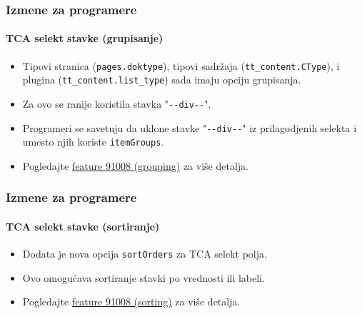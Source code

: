 
\begin{frame}[fragile]
	\frametitle{Izmene za programere}
	\framesubtitle{TCA selekt stavke (grupisanje)}

	\begin{itemize}
		\item Tipovi stranica (\texttt{pages.doktype}), tipovi sadržaja (\texttt{tt\_content.CType}),
			i plugina (\texttt{tt\_content.list\_type}) sada imaju opciju grupisanja.
		\item Za ovo se ranije koristila stavka
			"\texttt{-}\texttt{-div-}\texttt{-}".
		\item Programeri se savetuju da uklone stavke
			"\texttt{-}\texttt{-div-}\texttt{-}"
			iz prilagodjenih selekta i umesto njih koriste \texttt{itemGroups}.
		\item Pogledajte
			\href{https://docs.typo3.org/c/typo3/cms-core/master/en-us/Changelog/10.4/Feature-91008-ItemGroupingForTCASelectItems.html}{feature 91008 (grouping)}
			za više detalja.
	\end{itemize}

\end{frame}


\begin{frame}[fragile]
	\frametitle{Izmene za programere}
	\framesubtitle{TCA selekt stavke (sortiranje)}

	\begin{itemize}
		\item Dodata je nova opcija \texttt{sortOrders} za TCA selekt polja.
		\item Ovo omogućava sortiranje stavki po vrednosti ili labeli.
		\item Pogledajte
			\href{https://docs.typo3.org/c/typo3/cms-core/master/en-us/Changelog/10.4/Feature-91008-ItemSortingForTCASelectItems.html}{feature 91008 (sorting)}
			za više detalja.
	\end{itemize}

\end{frame}


